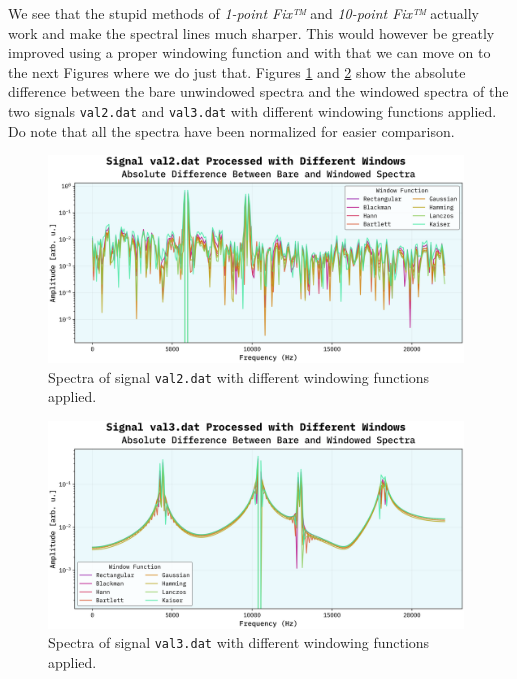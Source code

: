 \documentclass[10pt, titlepage, a4paper]{article}
\begin{document}
We see that the stupid methods of \textit{1-point Fix™} and \textit{10-point Fix™} actually work and make the spectral lines 
much sharper. This would however be greatly improved using a proper windowing function and with that we can move on to the next Figures 
where we do just that. Figures \ref{fig:windowing-val2} and \ref{fig:windowing-val3} show the absolute difference between the bare 
unwindowed spectra and the windowed spectra of the two signals \texttt{val2.dat} and \texttt{val3.dat} with different windowing functions applied.
Do note that all the spectra have been normalized for easier comparison.

\begin{figure}[H]
    \centering
    \includegraphics[width=0.98\textwidth]{../SpectralAnalysis/Images/window-spectra-val2.dat.png}
    \caption{Spectra of signal \texttt{val2.dat} with different windowing functions applied.}
    \label{fig:windowing-val2}
\end{figure}

\begin{figure}[H]
    \centering
    \includegraphics[width=0.98\textwidth]{../SpectralAnalysis/Images/window-spectra-val3.dat.png}
    \caption{Spectra of signal \texttt{val3.dat} with different windowing functions applied.}
    \label{fig:windowing-val3}
\end{figure}
\end{document}
